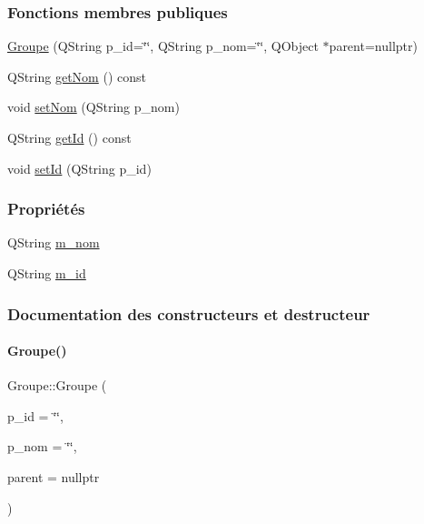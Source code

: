 \subsubsection*{Fonctions membres publiques}
\begin{DoxyCompactItemize}
\item 
\hyperlink{class_groupe_a8b907f38aebe5113d19052ee7c4ec935}{Groupe} (Q\+String p\+\_\+id=\char`\"{}\char`\"{}, Q\+String p\+\_\+nom=\char`\"{}\char`\"{}, Q\+Object $\ast$parent=nullptr)
\item 
Q\+String \hyperlink{class_groupe_a88bf0b7a0e69d549fa3fdb1b01c0de2c}{get\+Nom} () const
\item 
void \hyperlink{class_groupe_a44566810eab44cd98be317f4d803a45e}{set\+Nom} (Q\+String p\+\_\+nom)
\item 
Q\+String \hyperlink{class_groupe_aadab27e8d3f4a050a7bc4ae23c95efa7}{get\+Id} () const
\item 
void \hyperlink{class_groupe_a3cb79da346bcd56dee1c8305050fde60}{set\+Id} (Q\+String p\+\_\+id)
\end{DoxyCompactItemize}
\subsubsection*{Propriétés}
\begin{DoxyCompactItemize}
\item 
Q\+String \hyperlink{class_groupe_ad76b271599f46c8a350f8afa3bc884c5}{m\+\_\+nom}
\item 
Q\+String \hyperlink{class_groupe_ae837f3752cea27d8ab7678d4d1e4a764}{m\+\_\+id}
\end{DoxyCompactItemize}


\subsubsection{Documentation des constructeurs et destructeur}
\mbox{\label{class_groupe_a8b907f38aebe5113d19052ee7c4ec935}} 
\paragraph{\texorpdfstring{Groupe()}{Groupe()}}
{\footnotesize\ttfamily Groupe\+::\+Groupe (\begin{DoxyParamCaption}\item[{Q\+String}]{p\+\_\+id = {\ttfamily \char`\"{}\char`\"{}},  }\item[{Q\+String}]{p\+\_\+nom = {\ttfamily \char`\"{}\char`\"{}},  }\item[{Q\+Object $\ast$}]{parent = {\ttfamily nullptr} }\end{DoxyParamCaption})\hspace{0.3cm}{\ttfamily [explicit]}}


